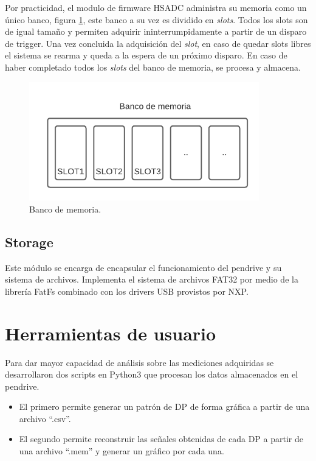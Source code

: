 Por practicidad, el modulo de firmware HSADC administra su memoria como un único banco, figura \ref{fig:firmBanco}, este banco a su vez es dividido en \textit{slots}. Todos los slots son de igual tamaño y permiten adquirir ininterrumpidamente a partir de un disparo de trigger. Una vez concluida la adquisición del \textit{slot},  en caso de quedar slots libres el sistema se rearma y queda a la espera de un próximo disparo. En caso de haber completado todos los \textit{slots} del banco de memoria, se procesa y almacena.

\begin{figure}[ht]
	\centering
	\includegraphics[width=100mm]{./Figures/firmBanco.png}
	\caption{Banco de memoria.}
	\label{fig:firmBanco}
\end{figure}

\newpage

\subsection{Storage}

Este módulo se encarga de encapsular el funcionamiento del pendrive y su sistema de archivos. Implementa el sistema de archivos FAT32 por medio de la librería FatFs \citep{chanWeb:1} combinado con los drivers USB provistos por NXP.


\section{Herramientas de usuario}

Para dar mayor capacidad de análisis sobre las mediciones adquiridas se desarrollaron dos scripts en Python3 que procesan los datos almacenados en el pendrive. 
\begin{itemize}
\item El primero permite generar un patrón de DP de forma gráfica a partir de una archivo \enquote{.csv}.
\item El segundo permite reconstruir las señales obtenidas de cada DP a partir de una archivo \enquote{.mem} y generar un gráfico por cada una.
\end{itemize}  

